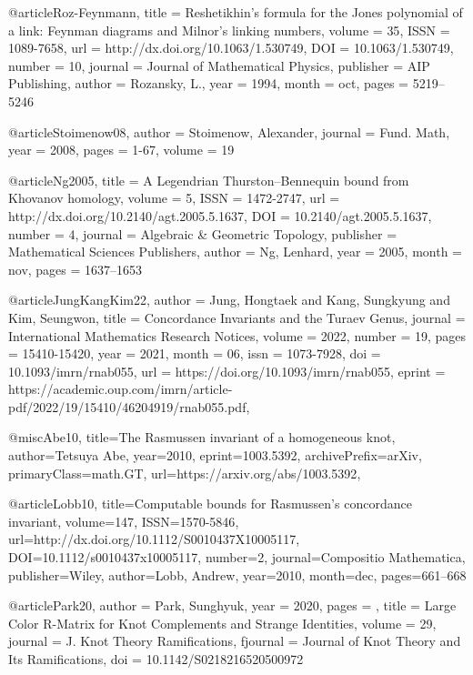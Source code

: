 @article{Roz-Feynmann,
  title = {Reshetikhin’s formula for the {Jones} polynomial of a link: {Feynman} diagrams and {Milnor’s} linking numbers},
  volume = {35},
  ISSN = {1089-7658},
  url = {http://dx.doi.org/10.1063/1.530749},
  DOI = {10.1063/1.530749},
  number = {10},
  journal = {Journal of Mathematical Physics},
  publisher = {AIP Publishing},
  author = {Rozansky,  L.},
  year = {1994},
  month = oct,
  pages = {5219--5246}
}

@article{Stoimenow08,
  author = {Stoimenow, Alexander},
  journal = {Fund. Math},
  year = 2008,
  pages = {1-67},
  volume = 19
}

@article{Ng2005,
  title = {A Legendrian Thurston--Bennequin bound from Khovanov homology},
  volume = {5},
  ISSN = {1472-2747},
  url = {http://dx.doi.org/10.2140/agt.2005.5.1637},
  DOI = {10.2140/agt.2005.5.1637},
  number = {4},
  journal = {Algebraic \& Geometric Topology},
  publisher = {Mathematical Sciences Publishers},
  author = {Ng,  Lenhard},
  year = {2005},
  month = nov,
  pages = {1637--1653}
}

@article{JungKangKim22,
  author = {Jung, Hongtaek and Kang, Sungkyung and Kim, Seungwon},
  title = {Concordance Invariants and the Turaev Genus},
  journal = {International Mathematics Research Notices},
  volume = {2022},
  number = {19},
  pages = {15410-15420},
  year = {2021},
  month = {06},
  issn = {1073-7928},
  doi = {10.1093/imrn/rnab055},
  url = {https://doi.org/10.1093/imrn/rnab055},
  eprint = {https://academic.oup.com/imrn/article-pdf/2022/19/15410/46204919/rnab055.pdf},
}



@misc{Abe10,
  title={The {Rasmussen} invariant of a homogeneous knot}, 
  author={Tetsuya Abe},
  year={2010},
  eprint={1003.5392},
  archivePrefix={arXiv},
  primaryClass={math.GT},
  url={https://arxiv.org/abs/1003.5392}, 
}

@article{Lobb10,
  title={Computable bounds for {Rasmussen’s} concordance invariant},
  volume={147},
  ISSN={1570-5846},
  url={http://dx.doi.org/10.1112/S0010437X10005117},
  DOI={10.1112/s0010437x10005117},
  number={2},
  journal={Compositio Mathematica},
  publisher={Wiley},
  author={Lobb, Andrew},
  year={2010},
  month=dec, pages={661--668} 
}


@article{Park20,
  author = {Park, Sunghyuk},
  year = 2020,
  pages = {},
  title = {Large Color {R}-Matrix for Knot Complements and Strange Identities},
  volume = 29,
  journal = {J. Knot Theory Ramifications},
  fjournal = {Journal of Knot Theory and Its Ramifications},
  doi = {10.1142/S0218216520500972}
}


